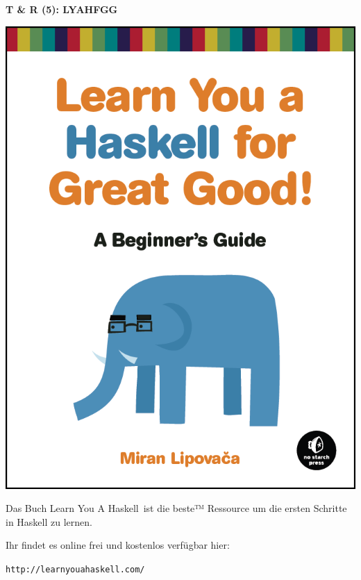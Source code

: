 \documentclass[unknownkeysallowed]{beamer}
\begin{document}
  \begin{frame}
    \begin{center}
    \Large\textbf{T \& R (5): LYAHFGG}\\ \bigskip \normalsize
    \begin{multicols}{2}
    
    \begin{center}
	\includegraphics[scale=0.15]{lyah.png} 
	\end{center}
	
	\columnbreak    
    Das Buch \glqq Learn You A Haskell\grqq\ ist die beste™ Ressource um die ersten 
    Schritte in Haskell zu lernen. \bigskip
   
    Ihr findet es online frei und kostenlos verfügbar hier:
    
    \texttt{http://learnyouahaskell.com/}
    \end{multicols}
    \end{center}
  \end{frame}
\end{document}
